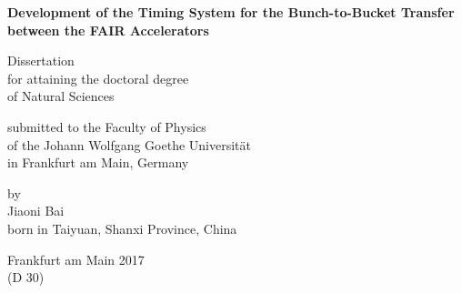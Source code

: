 \documentclass[12pt,twoside]{report}
\renewcommand{\_}{%
  \textunderscore\hspace{0pt}%
}
\begin{document}
\begin{center}
\thispagestyle{empty}

	 \vspace* {2cm}
	 \LARGE \textbf{Development of the Timing System for the Bunch-to-Bucket Transfer between the FAIR Accelerators }\par
	 \vspace{2cm}
    	 \vspace{2cm}

{ \normalsize  Dissertation\\
	for attaining the doctoral degree\\
	of Natural Sciences\par}
    \vspace{2cm}

{ \normalsize submitted to the Faculty of Physics\\
	of the Johann Wolfgang Goethe Universit\"at\\
	in Frankfurt am Main, Germany\par}
    \vspace{2cm}

{ \normalsize by\\
	Jiaoni Bai\\
	born in Taiyuan, Shanxi Province, China\par}
    \vspace{2cm}

    \vspace{2cm}
{ \normalsize Frankfurt am Main 2017\\
	(D 30)\par}
\end{center}
\end{document}
